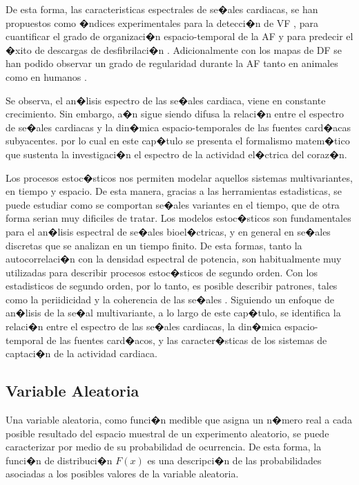 De esta forma, las caracteristicas espectrales de se�ales cardiacas, se han
propuestos como �ndices experimentales para la detecci�n de \ac{VF} \cite
{Barro89}, para cuantificar el grado de organizaci�n espacio-temporal de la
\ac{AF} \cite{Everett01a} y para predecir el �xito de
descargas de desfibrilaci�n \cite{Strohmenger97, Eftestol00, Jekova04}. 
Adicionalmente con los mapas de \ac{DF} se han podido observar un grado de
regularidad durante la \ac{AF} tanto en animales \cite{Skanes98,
Mandapati00, Mansour01} como en humanos \cite{Sanders05, Atienza06}. 

Se observa, el an�lisis espectro de las se�ales cardiaca, viene en
constante crecimiento. Sin embargo, a�n sigue siendo difusa la relaci�n entre el
espectro de se�ales cardiacas y la din�mica espacio-temporales de las fuentes
card�acas subyacentes. por lo cual en este cap�tulo se presenta  el formalismo
matem�tico que sustenta la investigaci�n el espectro de la actividad el�ctrica
del coraz�n.




Los procesos estoc�sticos nos permiten modelar aquellos sistemas multivariantes,
en tiempo y espacio. De esta manera, gracias a las herramientas estadisticas, se
puede estudiar como se comportan se�ales variantes en el tiempo, que de otra
forma serian muy dificiles de tratar. Los modelos estoc�sticos son fundamentales
para el an�lisis espectral de se�ales bioel�ctricas, y en general en se�ales
discretas que se analizan en un tiempo finito. De esta formas, tanto la
autocorrelaci�n con la densidad espectral de potencia, son habitualmente muy
utilizadas para describir procesos estoc�sticos de segundo orden. Con los
estadisticos de segundo orden, por lo tanto, es posible describir patrones,
tales como la periidicidad y la coherencia de las se�ales
\cite{Requena08}. Siguiendo un enfoque de an�lisis de la se�al multivariante, a
lo largo de este cap�tulo, se identifica la relaci�n entre el
espectro de las se�ales cardiacas, la din�mica espacio-temporal de las fuentes
card�acos, y las caracter�sticas de los sistemas de captaci�n de la actividad
cardiaca.





\subsection{Variable Aleatoria}\label{subs:varaleatoria}

Una variable aleatoria, como funci�n medible que asigna un n�mero real a cada
posible resultado del espacio muestral de un experimento aleatorio, se puede
caracterizar por medio de su probabilidad de ocurrencia. De esta forma, la
funci�n de distribuci�n ${F(x)}$  es una descripci�n de las probabilidades
asociadas a los posibles valores de la variable aleatoria.

